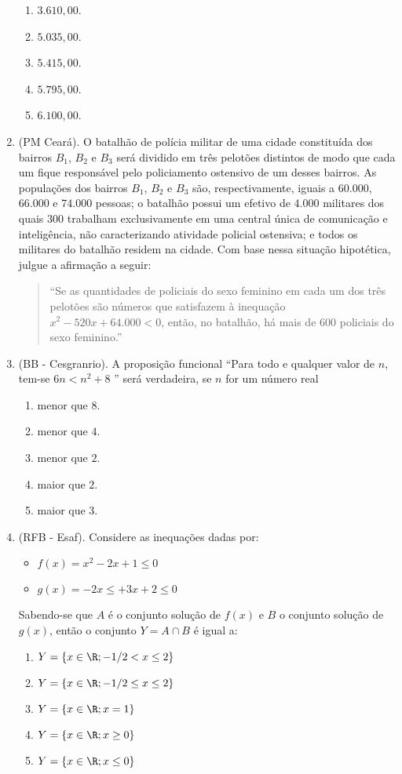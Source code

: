 \begin{enumerate}
\begin{enumerate}
\item $3.610{,}00$.
\item $5.035{,}00$.
\item $5.415{,}00$.
\item $5.795{,}00$.
\item $6.100{,}00$.
\end{enumerate}


\item (PM Ceará). O batalhão de polícia militar de uma cidade constituída dos bairros $B_1$, $B_2$ e $B_3$ será dividido em três pelotões distintos de modo que cada um fique responsável pelo policiamento ostensivo de um desses bairros. As populações dos bairros $B_1$, $B_2$ e $B_3$ são, respectivamente, iguais a $60.000$, $66.000$ e $74.000$ pessoas; o batalhão possui um efetivo de $4.000$ militares dos quais $300$ trabalham exclusivamente em uma central única de comunicação e inteligência, não caracterizando atividade policial ostensiva; e todos os militares do batalhão residem na cidade. Com base nessa situação hipotética, julgue a afirmação a seguir:
\begin{quote}
“Se as quantidades de policiais do sexo feminino em cada um dos três pelotões são números que satisfazem à inequação $x^2 - 520x + 64.000 < 0$, então, no batalhão, há mais de $600$ policiais do sexo feminino.”
\end{quote}

\item (BB - Cesgranrio). A proposição funcional “Para todo e qualquer valor de $n$, tem-se $6n < n^2 + 8$  ” será verdadeira, se $n$ for um número real
\begin{enumerate}
\item menor que $8$.
\item menor que $4$.
\item menor que $2$.
\item maior que $2$.
\item maior que $3$.
\end{enumerate}

\item (RFB - Esaf). Considere as inequações dadas por:
\begin{itemize}
\item $f(x) = x^2 - 2x + 1 \leq 0$
\item $g(x) = -2x\leq + 3x + 2 \leq 0$
\end{itemize}
Sabendo-se que $A$ é o conjunto solução de $f(x)$ e $B$ o conjunto solução de $g(x)$, então o conjunto $Y = A \cap B$ é igual a:
\begin{enumerate}
\item $Y = \{ x \in \R ; -1/2 < x \leq 2 \}$
\item $Y = \{ x \in \R ; -1/2 \leq x \leq 2 \}$
\item $Y = \{ x \in \R ; x = 1 \}$
\item $Y = \{ x \in \R ; x \geq 0 \}$
\item $Y = \{ x \in \R ; x \leq 0 \}$
\end{enumerate}



\end{enumerate}

